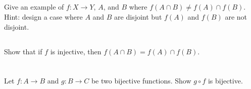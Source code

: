 \documentclass[11pt,letterpaper]{article}
\begin{document}
\subsection{}
Give an example of $f: X\rightarrow Y$, $A$, and $B$ where $f(A \cap B) \neq f(A) \cap f(B)$. Hint: design a case where $A$ and $B$ are disjoint but $f(A)$ and $f(B)$ are not disjoint.

\subsection{}
Show that if $f$ is injective, then $f(A\cap B) = f(A) \cap f(B)$.





\section{}
Let $f: A\to B$ and $g: B\to C$ be two bijective functions.  Show $g\circ f$ is bijective.



\end{document}
